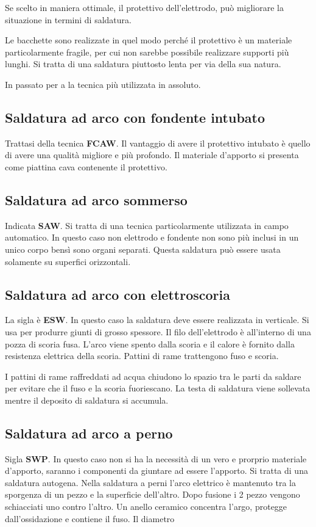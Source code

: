 Se scelto in maniera ottimale, il protettivo dell'elettrodo, può migliorare la situazione in termini di saldatura.

Le bacchette sono realizzate in quel modo perché il protettivo è un materiale particolarmente fragile, per cui non sarebbe possibile realizzare supporti più lunghi.
Si tratta di una saldatura piuttosto lenta per via della sua natura.

In passato per a la tecnica più utilizzata in assoluto.

\subsection{Saldatura ad arco con fondente intubato}
Trattasi della tecnica \textbf{FCAW}.
Il vantaggio di avere il protettivo intubato è quello di avere una qualità migliore e più profondo. Il materiale d'apporto si presenta come piattina cava contenente il protettivo.


\subsection{Saldatura ad arco sommerso}
Indicata \textbf{SAW}.
Si tratta di una tecnica particolarmente utilizzata in campo automatico.
In questo caso non elettrodo e fondente non sono più inclusi in un unico corpo bensì sono organi separati.
Questa saldatura può essere usata solamente su superfici orizzontali.


\subsection{Saldatura ad arco con elettroscoria}
La sigla è \textbf{ESW}.
In questo caso la saldatura deve essere realizzata in verticale.
Si usa per produrre giunti di grosso spessore.
Il filo dell'elettrodo è all'interno di una pozza di scoria fusa.
L'arco viene spento dalla scoria e il calore è fornito dalla resistenza elettrica della scoria.
Pattini di rame trattengono fuso e scoria.

I pattini di rame raffreddati ad acqua chiudono lo spazio tra le parti da saldare per evitare che il fuso e la scoria fuoriescano.
La testa di saldatura viene sollevata mentre il deposito di saldatura si accumula.

\subsection{Saldatura ad arco a perno}
Sigla \textbf{SWP}.
In questo caso non si ha la necessità di un vero e prorprio materiale d'apporto, saranno i componenti da giuntare ad essere l'apporto.
Si tratta di una saldatura autogena.
Nella saldatura a perni l'arco elettrico è mantenuto tra la sporgenza di un pezzo e la superficie dell'altro.
Dopo fusione i 2 pezzo vengono schiacciati uno contro l'altro.
Un anello ceramico concentra l'argo, protegge dall'ossidazione e contiene il fuso.
Il diametro \todo{\\Aggiungi}

